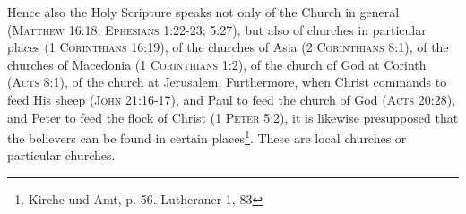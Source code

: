                 Hence also the Holy Scripture speaks not only of the Church in general {\scriptsize \textsc{(Matthew 16:18; Ephesians 1:22-23; 5:27)}},  but also of churches in particular places {\scriptsize \textsc {(1 Corinthians 16:19)}}, of the churches of Asia {\scriptsize\textsc{(2 Corinthians 8:1)}}, of the churches of Macedonia {\scriptsize\textsc{(1 Corinthians 1:2)}}, of the church of God at Corinth {\scriptsize\textsc{(Acts 8:1)}}, of the church at Jerusalem.  Furthermore, when Christ commands to feed His sheep {\scriptsize\textsc{(John 21:16-17)}}, and Paul to feed the church of God {\scriptsize\textsc{(Acts 20:28)}}, and Peter to feed the flock of Christ {\scriptsize\textsc{(1 Peter 5:2)}}, it is likewise presupposed that the believers can be found in certain places\footnote{Kirche und Amt, p. 56. Lutheraner 1, 83}.  These are local churches or particular churches.

